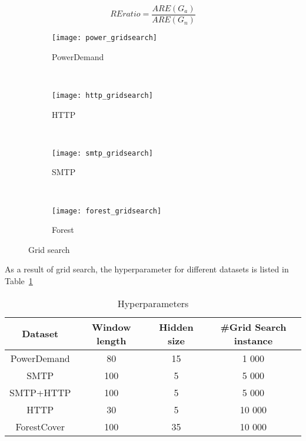 \begin{equation}\label{eq:ratio}
REratio=\frac{ARE(G_a)}{ARE(G_n)}
\end{equation}

\begin{figure}[h]
\centering
	\begin {subfigure}[t]{0.45\textwidth}
	\centering
	\texttt{[image: power\_gridsearch]}
	\caption{PowerDemand}
	\label{fig:power}
	\end{subfigure}
	~
	\begin {subfigure}[t]{0.45\textwidth}
	\centering
	\texttt{[image: http\_gridsearch]}
	\caption{HTTP}
	\label{fig:http}
	\end{subfigure}
	~
	\begin {subfigure}[t]{0.45\textwidth}
	\centering
	\texttt{[image: smtp\_gridsearch]}
	\caption{SMTP}
	\label{fig:smtp}
	\end{subfigure}
	~
	\begin {subfigure}[t]{0.45\textwidth}
	\centering
	\texttt{[image: forest\_gridsearch]}
	\caption{Forest}
	\label{fig:forest}
	\end{subfigure}

	\caption[Grid search]{Grid search}
\label{fig:gridsearch}
\end{figure}

As a result of grid search, the hyperparameter for different datasets is listed in Table~\ref{tab:hyper}

\begin{table}[h] 
\caption{Hyperparameters} 
\centering      
\begin{tabular}{c c c c}  
\hline\hline        
Dataset & Window length & Hidden size & \#Grid Search instance \\ [0.5ex] 
\hline 
PowerDemand & 80 & 15 & 1 000 \\  
SMTP & 100 & 5 &  5 000 \\ 
SMTP+HTTP & 100 & 5 & 5 000 \\ 
HTTP & 30 & 5  &  10 000 \\ 
ForestCover & 100 & 35 & 10 000 \\ [1ex]  
\hline    
\end{tabular}
\label{tab:hyper}  
\end{table} 











